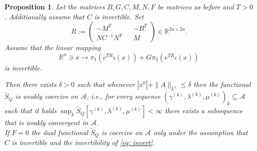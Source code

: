 \documentclass[11pt]{article}
\newcommand{\R}{\mathbb R}
\newtheorem{proposition}{Proposition}[section]
\newcommand{\JG}[1]{{\color{blue} JG:  #1}}
\begin{document}
\begin{proposition}\label{prop: coer}
Let the matrices $B,G,C,M,N, F$ be matrices as before and $T>0$. Additionally assume that $C$ is invertible. 
Set 
\begin{equation}\label{eq: defR}
R := \begin{pmatrix} -M^T && - B^T \\ N C^{-1}N^T &&  M \end{pmatrix} \in \R^{2n \times 2n}.
\end{equation}
Assume that the linear mapping 
\begin{equation} \label{eq: invert}
\R^n \ni x \rightarrow \pi_1 (e^{TR}  \iota(x)) + G \pi_2 (e^{TR} \iota(x)) 
\end{equation}
is invertible.

Then there exists $\delta>0$ such that whenever $|x^0| + \| A \|_{L^1} \leq \delta$ then the functional $\tilde{S}_Q$ is weakly coercive on $\mathcal{A}$, i.e., for every sequence $(\gamma^{(k)},\lambda^{(k)}, \mu^{(k)})_k \subseteq \mathcal{A}$ such that it holds $\sup_k \tilde{S}_Q[\gamma^{(k)},\lambda^{(k)}, \mu^{(k)}] < \infty$ there exists a subsequence that is weakly convergent in $\mathcal{A}$.  \\
If $F=0$ the dual functional $\tilde{S}_Q$ is coercive on $\mathcal{A}$ only under the assumption that $C$ is invertible and the invertibility of \eqref{eq: invert}.

\end{proposition}
\end{document}
